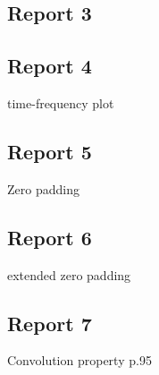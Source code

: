 \documentclass[11pt,titlepage]{report}
\begin{document}
\subsection{Report 3}



\subsection{Report 4}
time-frequency plot
\subsection{Report 5}
Zero padding
\subsection{Report 6}
extended zero padding
\subsection{Report 7}
Convolution property p.95
\end{document}
